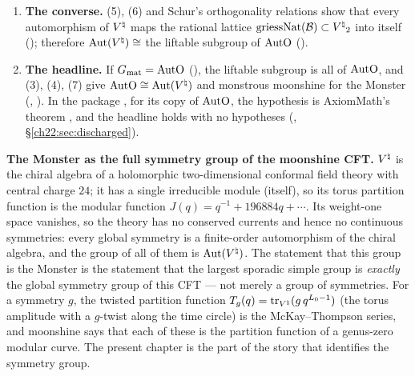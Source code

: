 \begin{enumerate}[label=(\arabic*)]
  $\chtwentytwoGmat$ is $a\cdot1+b\cdot P_0$, $P_0$ the projection onto the line of the identity element
  ().
\item \textbf{The converse.}  (5), (6) and Schur's orthogonality relations show that every automorphism of ${V^{\natural}}$
  maps the rational lattice $\mathrm{griessNat}(\mathcal{B})\subset{V^{\natural}}_2$ into itself ();
  therefore $\operatorname{Aut}({V^{\natural}})\cong$ the liftable subgroup of $\mathrm{AutO}$ ().
\item \textbf{The headline.}  If $G_{\mathrm{mat}}=\mathrm{AutO}$ (), the liftable subgroup is all of
  $\mathrm{AutO}$, and (3), (4), (7) give $\mathrm{AutO}\cong\operatorname{Aut}({V^{\natural}})$ and monstrous moonshine for the Monster
  (, ).  In the package , for its copy of
  $\mathrm{AutO}$, the hypothesis is AxiomMath's theorem , and the headline holds with no hypotheses
  (, \S\ref{ch22:sec:discharged}).
\end{enumerate}

\begin{physics}
\textbf{The Monster as the full symmetry group of the moonshine CFT.}  ${V^{\natural}}$ is the chiral algebra of a
holomorphic two-dimensional conformal field theory with central charge $24$; it has a single irreducible module
(itself), so its torus partition function is the modular function $J(q)=q^{-1}+196884q+\cdots$.  Its weight-one
space vanishes, so the theory has no conserved currents and hence no continuous symmetries: every global symmetry
is a finite-order automorphism of the chiral algebra, and the group of all of them is $\operatorname{Aut}({V^{\natural}})$.  The
statement that this group is the Monster is the statement that the largest sporadic simple group is \emph{exactly}
the global symmetry group of this CFT --- not merely a group of symmetries.  For a symmetry $g$, the twisted
partition function $T_g(q)=\operatorname{tr}_{{V^{\natural}}}(g\,q^{L_0-1})$ (the torus amplitude with a $g$-twist along the time
circle) is the McKay--Thompson series, and moonshine says that each of these is the partition function of a
genus-zero modular curve.  The present chapter is the part of the story that identifies the symmetry group.
\end{physics}

